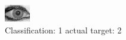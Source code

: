 \begin{figure}[h!]
\begin{center}
\includegraphics[width=0.60\columnwidth]{figures/ID2038_class_1_target_2.png}
\end{center}
\caption{ Classification: 1 actual target: 2}
\label{fig:ID2038_class_1_target_2}
\end{figure}
